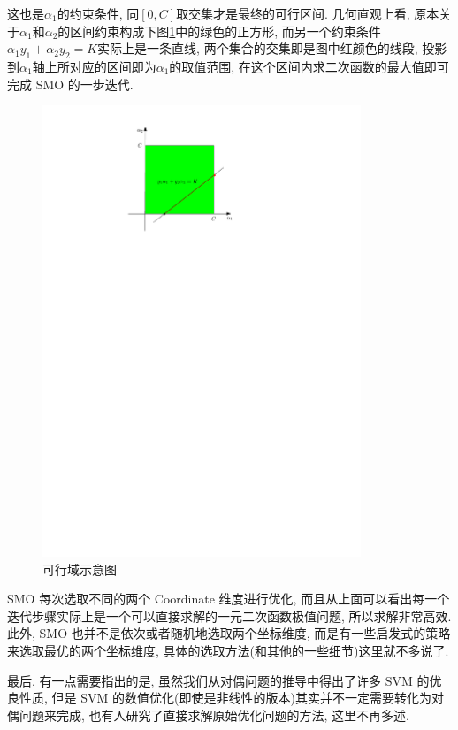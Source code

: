 \documentclass[a4paper,UTF8]{ctexart}
\theoremstyle{plain} \newtheorem{theorem}{定理}[section]
\theoremstyle{plain} \newtheorem{definition}{定义}[section]
\theoremstyle{plain} \newtheorem{lemma}{引理}[section]
\theoremstyle{plain} \newtheorem{proposition}{命题}[section]
\theoremstyle{plain} \newtheorem{example}{例}
\theoremstyle{plain} \newtheorem{remark}{注}
\theoremstyle{plain} \newtheorem{corollary}{推论}[section]
\begin{document}
这也是$\alpha_{1}$的约束条件, 同$[0,C]$取交集才是最终的可行区间. 几何直观上看, 原本关于$\alpha_{1}$和$\alpha_{2}$的区间约束构成下图\ref{region}中的绿色的正方形, 而另一个约束条件$\alpha_{1} y_{1} + \alpha_{2} y_{2} = K$实际上是一条直线, 两个集合的交集即是图中红颜色的线段, 投影到$\alpha_1$轴上所对应的区间即为$\alpha_1$的取值范围, 在这个区间内求二次函数的最大值即可完成 SMO 的一步迭代.
\begin{figure}[!htb]
	\centering
	\includegraphics[width=0.85\textwidth]{quader.pdf}
	\caption{可行域示意图}
	\label{region}
\end{figure}

SMO 每次选取不同的两个 Coordinate 维度进行优化, 而且从上面可以看出每一个迭代步骤实际上是一个可以直接求解的一元二次函数极值问题, 所以求解非常高效. 此外, SMO 也并不是依次或者随机地选取两个坐标维度, 而是有一些启发式的策略来选取最优的两个坐标维度, 具体的选取方法(和其他的一些细节)这里就不多说了.

最后, 有一点需要指出的是, 虽然我们从对偶问题的推导中得出了许多 SVM 的优良性质, 但是 SVM 的数值优化(即使是非线性的版本)其实并不一定需要转化为对偶问题来完成, 也有人研究了直接求解原始优化问题的方法, 这里不再多述.
\end{document}
